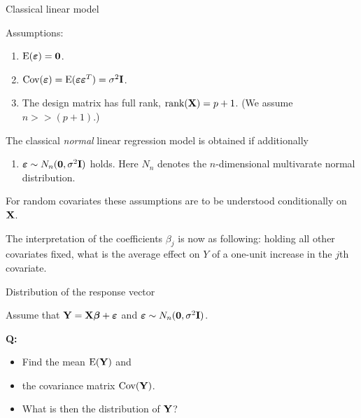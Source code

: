 \documentclass[ignorenonframetext,]{beamer}
\providecommand{\tightlist}{%
  \setlength{\itemsep}{0pt}\setlength{\parskip}{0pt}}
\begin{document}
\begin{frame}

\begin{block}{Classical linear model}

Assumptions:

\begin{enumerate}
\def\labelenumi{\arabic{enumi}.}
\tightlist
\item
  \(\text{E}(\boldsymbol{\varepsilon})=\bf{0}\).
\item
  \(\text{Cov}(\boldsymbol{\varepsilon})=\text{E}(\boldsymbol{\varepsilon}\boldsymbol{\varepsilon}^T)=\sigma^2\bf{I}\).
\item
  The design matrix has full rank, \(\text{rank}({\bf X})=p+1\). (We
  assume \(n>>(p+1)\).)
\end{enumerate}

The classical \emph{normal} linear regression model is obtained if
additionally

\begin{enumerate}
\def\labelenumi{\arabic{enumi}.}
\setcounter{enumi}{3}
\tightlist
\item
  \(\boldsymbol\varepsilon\sim N_n({\bf 0},\sigma^2 {\bf I})\) holds.
  Here \(N_n\) denotes the \(n\)-dimensional multivarate normal
  distribution.
\end{enumerate}

For random covariates these assumptions are to be understood
conditionally on \({\bf X}\).

The interpretation of the coefficients \(\beta_j\) is now as following:
holding all other covariates fixed, what is the average effect on \(Y\)
of a one-unit increase in the \(j\)th covariate.

\end{block}

\end{frame}

\begin{frame}

\begin{block}{Distribution of the response vector}

Assume that \({\bf Y=X \boldsymbol\beta}+{\boldsymbol \varepsilon}\) and
\(\boldsymbol\varepsilon\sim N_n({\bf 0},\sigma^2 {\bf I})\).

\textbf{Q:}

\begin{itemize}
\tightlist
\item
  Find the mean \(\text{E}(\bf Y)\) and
\item
  the covariance matrix \(\text{Cov}(\bf Y)\).
\item
  What is then the distribution of \(\bf Y\)?
\end{itemize}

\end{block}

\end{frame}
\end{document}
